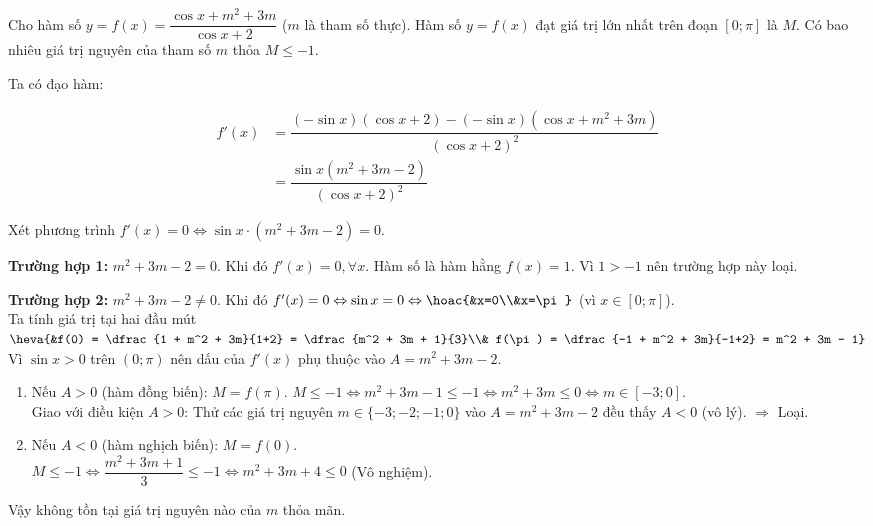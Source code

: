 \begin{ex}%
Cho hàm số $y = f(x) = \dfrac{\cos x + m^2 + 3m}{\cos x + 2}$ ($m$ là tham số thực). Hàm số $y = f(x)$ đạt giá trị lớn nhất trên đoạn $[0; \pi]$ là $M$. Có bao nhiêu giá trị nguyên của tham số $m$ thỏa $M \le -1$.
\loigiai
{ Ta có đạo hàm:

	\begin{eqnarray*}
		f'(x) &= \dfrac{(-\sin x)(\cos x + 2) - (-\sin x)(\cos x + m^2 + 3m)}{(\cos x + 2)^2} \\
		&= \dfrac{\sin x (m^2 + 3m - 2)}{(\cos x + 2)^2}
	\end{eqnarray*}

	Xét phương trình $f'(x) = 0 \Leftrightarrow \sin x \cdot (m^2 + 3m - 2) = 0$.
	
	\textbf{Trường hợp 1:} $m^2 + 3m - 2 = 0$.
	Khi đó $f'(x) = 0, \forall x$. Hàm số là hàm hằng $f(x) = 1$.
	Vì $1 > -1$ nên trường hợp này loại.
	
	\textbf{Trường hợp 2:} $m^2 + 3m - 2 \ne 0$.
	Khi đó $f'(x) = 0 \Leftrightarrow \sin x = 0 \Leftrightarrow \hoac{&x=0\\&x=\pi}$ (vì $x \in [0; \pi]$).\\
	Ta tính giá trị tại hai đầu mút
	$\heva{&f(0) = \dfrac{1 + m^2 + 3m}{1+2} = \dfrac{m^2 + 3m + 1}{3}\\& f(\pi) = \dfrac{-1 + m^2 + 3m}{-1+2} = m^2 + 3m - 1}$\\
	Vì $\sin x > 0$ trên $(0; \pi)$ nên dấu của $f'(x)$ phụ thuộc vào $A = m^2 + 3m - 2$.
	\begin{enumerate}
		\item Nếu $A > 0$ (hàm đồng biến): $M = f(\pi)$.
		 $M \le -1 \Leftrightarrow m^2 + 3m - 1 \le -1 \Leftrightarrow m^2 + 3m \le 0 \Leftrightarrow m \in [-3; 0]$.\\
		Giao với điều kiện $A > 0$: Thử các giá trị nguyên $m \in \{-3; -2; -1; 0\}$ vào $A = m^2 + 3m - 2$ đều thấy $A < 0$ (vô lý). $\Rightarrow$ Loại.
		\item Nếu $A < 0$ (hàm nghịch biến): $M = f(0)$.\\
$M \le -1 \Leftrightarrow \dfrac{m^2 + 3m + 1}{3} \le -1 \Leftrightarrow m^2 + 3m + 4 \le 0$ (Vô nghiệm).
	\end{enumerate}
Vậy không tồn tại giá trị nguyên nào của $m$ thỏa mãn.
}
\end{ex}
